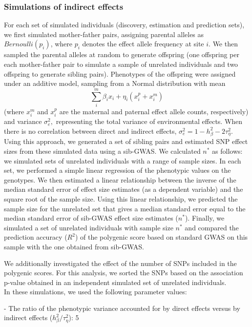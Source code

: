 \documentclass[hidelinks, 12pt]{article}
\begin{document}
\subsubsection{Simulations of indirect effects}
\label{indirect_sim_details}
For each set of simulated individuals (discovery, estimation and prediction sets), we first simulated mother-father pairs, assigning parental alleles as $Bernoulli(p_i)$, where $p_i$ denotes the effect allele frequency at site $i$.  We then sampled the parental alleles at random to generate offspring (one offspring per each mother-father pair to simulate a sample of unrelated individuals and two offspring to generate sibling pairs). Phenotypes of the offspring were assigned under an additive model, sampling from a Normal distribution with mean
$$\sum_i^m\beta_ix_i+\eta_i({x}_i^p+{x}_i^m)$$ (where ${x}_i^m$ and ${x}_i^p$ are the maternal and paternal effect allele counts, respectively) and variance $\sigma_e^2,$ representing the total variance of  environmental effects. When there is no correlation between direct and indirect effects, $\sigma_e^2=1-h_{\beta}^2-2\tau_{\eta}^2$. Using this approach, we generated a set of sibling pairs and estimated SNP effect sizes from these simulated data using a sib-GWAS. We calculated $n^*$ as follows: we simulated sets of unrelated individuals with a range of sample sizes. In each set, we performed a simple linear regression of the phenotypic values on the genotypes.  We then estimated a linear relationship between the inverse of the median standard error of effect size estimates (as a dependent variable) and the square root of the sample size.  Using this linear relationship, we predicted the sample size for the unrelated set that gives a median standard error equal to the median standard error of sib-GWAS effect size estimates ($n^*$).  Finally, we simulated a set of unrelated individuals with sample size $n^*$ and compared the prediction accuracy ($R^2$) of the polygenic score based on standard GWAS on this sample with the one obtained from sib-GWAS.

We additionally investigated the effect of the number of SNPs included in the polygenic scores. For this analysis, we sorted the SNPs based on the association p-value obtained in an independent simulated set of unrelated individuals.\\

In these simulations, we used the following parameter values:

- The ratio of the phenotypic variance accounted for by direct effects versus by indirect effects ($h_{\beta}^2/\tau_{\eta}^2$): 5
\end{document}
